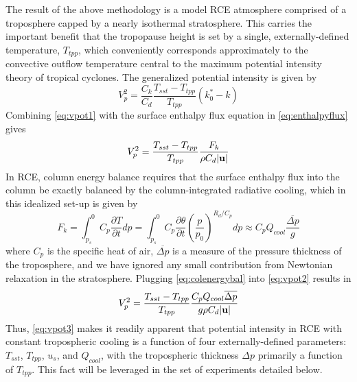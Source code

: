 \documentclass[12pt]{article}
\begin{document}
The result of the above methodology is a model RCE atmosphere comprised of a troposphere capped by a nearly isothermal stratosphere. This carries the important benefit that the tropopause height is set by a single, externally-defined temperature, $T_{tpp}$, which conveniently corresponds approximately to the convective outflow temperature central to the maximum potential intensity theory of tropical cyclones.  
The generalized potential intensity \citep{Emanuel_2010} is given by
\begin{equation}
\label{eq:vpot1}
V^2_p = \frac{C_k}{C_d}\frac{T_{sst} - T_{tpp}}{T_{tpp}}(k^*_0-k)
\end{equation}
Combining \eqref{eq:vpot1} with the surface enthalpy flux equation in \eqref{eq:enthalpyflux} gives
\begin{equation}
\label{eq:vpot2}
V^2_p = \frac{T_{sst} - T_{tpp}}{T_{tpp}}\frac{F_k}{\rho C_d |{\bf u}|}
\end{equation}
In RCE, column energy balance requires that the surface enthalpy flux into the column be exactly balanced by the column-integrated radiative cooling, which in this idealized set-up is given by
\begin{equation}
\label{eq:colenergybal}
F_k = \int^0_{p_s}{C_p\frac{\partial T}{\partial t}}dp = \int^0_{p_s}{C_p\frac{\partial \theta}{\partial t}\left(\frac{p}{p_0}\right)^{R_d/C_p}}dp\approx C_p Q_{cool} \frac{\overline{\Delta p}}{g}
\end{equation}
where $C_p$ is the specific heat of air, $\overline{\Delta p}$ is a measure of the pressure thickness of the troposphere, and we have ignored any small contribution from Newtonian relaxation in the stratosphere.  Plugging \eqref{eq:colenergybal} into \eqref{eq:vpot2} results in
\begin{equation}
\label{eq:vpot3}
V^2_p = \frac{T_{sst} - T_{tpp}}{T_{tpp}}\frac{C_p Q_{cool} \overline{ \Delta p}}{g \rho C_d |{\bf u}|}
\end{equation}
Thus, \eqref{eq:vpot3} makes it readily apparent that potential intensity in RCE with constant tropospheric cooling is a function of four externally-defined parameters: $T_{sst}$, $T_{tpp}$, $u_s$, and $Q_{cool}$, with the tropospheric thickness $\Delta p$ primarily a function of $T_{tpp}$. This fact will be leveraged in the set of experiments detailed below.
\end{document}
